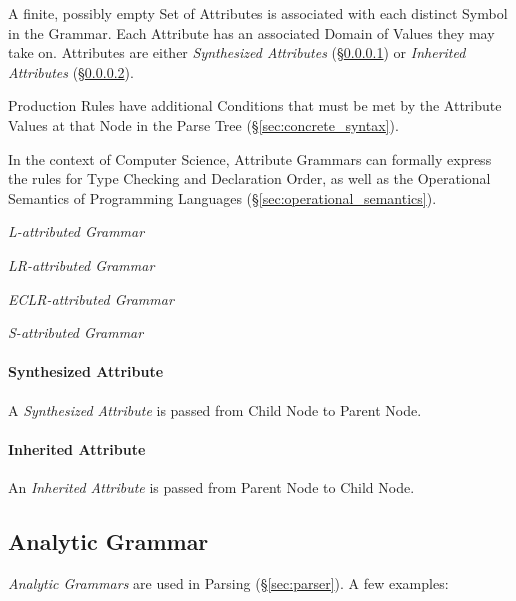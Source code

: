 A finite, possibly empty Set of Attributes is associated with each
distinct Symbol in the Grammar. Each Attribute has an associated
Domain of Values they may take on. Attributes are either
\emph{Synthesized Attributes} (\S\ref{sec:synthesized_attribute}) or
\emph{Inherited Attributes} (\S\ref{sec:inherited_attribute}).

Production Rules have additional Conditions that must be met by the
Attribute Values at that Node in the Parse Tree
(\S\ref{sec:concrete_syntax}).

In the context of Computer Science, Attribute Grammars can formally
express the rules for Type Checking and Declaration Order, as well as
the Operational Semantics of Programming Languages
(\S\ref{sec:operational_semantics}).

\emph{L-attributed Grammar}

\emph{LR-attributed Grammar}

\emph{ECLR-attributed Grammar}

\emph{S-attributed Grammar}



\paragraph{Synthesized Attribute}\label{sec:synthesized_attribute}\hfill

A \emph{Synthesized Attribute} is passed from Child Node to Parent
Node.



\paragraph{Inherited Attribute}\label{sec:inherited_attribute}\hfill

An \emph{Inherited Attribute} is passed from Parent Node to Child
Node.



\subsection{Analytic Grammar}\label{sec:analytic_grammar}

\emph{Analytic Grammars} are used in Parsing (\S\ref{sec:parser}). A
few examples:

